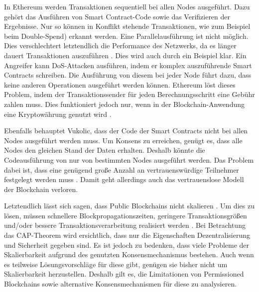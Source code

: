 In Ethereum werden Transaktionen sequentiell bei allen Nodes ausgeführt. Dazu gehört das Ausführen von Smart Contract-Code sowie das Verifizieren der Ergebnisse. Nur so können in Konflikt stehende Transaktionen, wie zum Beispiel beim Double-Spend) erkannt werden. Eine Parallelausführung ist nicht möglich. Dies verschlechtert letztendlich die Performance des Netzwerks, da es länger dauert Transaktionen auszuführen \cite{SchererPerformanceScalabilityBlockchain2017}. Dies wird auch durch ein Beispiel klar. Ein Angreifer kann DoS-Attacken ausführen, indem er komplex auszuführende Smart Contracts schreiben. Die Ausführung von diesem bei jeder Node führt dazu, dass keine anderen Operationen ausgeführt werden können. Ethereum löst dieses Problem, indem der Transaktionssender für jeden Berechnungsschritt eine Gebühr zahlen muss. Dies funktioniert jedoch nur, wenn in der Blockchain-Anwendung eine Kryptowährung genutzt wird \cite{VukolicRethinkingPermissionedBlockchains2017}. 

Ebenfalls behauptet Vukolic, dass der Code der Smart Contracts nicht bei allen Nodes ausgeführt werden muss. Um Konsens zu erreichen, genügt es, dass alle Nodes den gleichen Stand der Daten erhalten. Deshalb könnte die Codeausführung von nur von bestimmten Nodes ausgeführt werden. Das Problem dabei ist, dass eine genügend große Anzahl an vertrauenswürdige Teilnehmer festgelegt werden muss \cite{VukolicRethinkingPermissionedBlockchains2017}. Damit geht allerdings auch das vertrauenslose Modell der Blockchain verloren.

Letztendlich lässt sich sagen, dass Public Blockchains nicht skalieren . Um dies zu lösen, müssen  schnellere Blockpropagationszeiten, geringere Transaktionsgrößen und/oder bessere Transaktionsverarbeitung realisiert werden \cite{SchererPerformanceScalabilityBlockchain2017}. Bei Betrachtung das CAP-Theorem wird ersichtlich, dass nur die Eigenschaften Dezentralisierung und Sicherheit gegeben sind. Es ist jedoch zu bedenken, dass viele Probleme der Skalierbarkeit aufgrund des genutzten Konsensmechanismus bestehen. Auch wenn es teilweise Lösungsvorschläge für diese gibt, genügen sie bisher nicht um Skalierbarkeit herzustellen. Deshalb gilt es, die Limitationen von Permissioned Blockchains sowie alternative Konsensmechanismen für diese zu analysieren.


